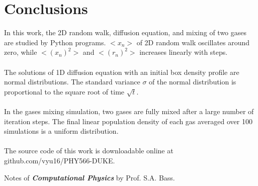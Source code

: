 \documentclass{article}
\begin{document}
\section{Conclusions}
In this work, the 2D random walk, diffusion equation, and mixing of two gases are studied by Python programs. $<x_n>$ of 2D random walk oscillates around zero, while $<(x_n)^2>$ and $<(r_n)^2>$ increases linearly with steps.\\
\\
The solutions of 1D diffusion equation with an initial box density profile are normal distributions. The standard variance $\sigma$ of the normal distribution is proportional to the square root of time $\sqrt{t}$.\\
\\
In the gases mixing simulation, two gases are fully mixed after a large number of iteration steps. The final linear population density of each gas averaged over 100 simulations is a uniform distribution.\\
\\
The source code of this work is downloadable online at github.com/vyu16/PHY566-DUKE.

\begin{thebibliography}{9}
Notes of \textbf{\textit{Computational Physics}} by Prof. S.A. Bass.
\end{thebibliography}
\end{document}
